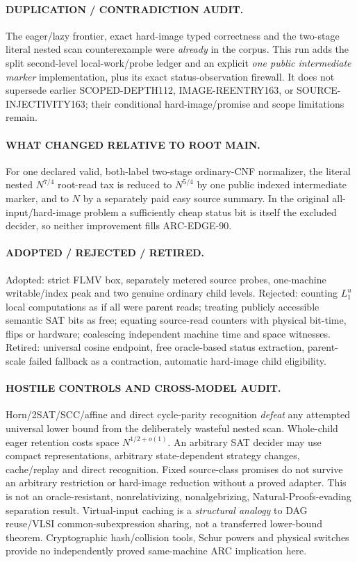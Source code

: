 \documentclass[11pt]{article}
\begin{document}
\paragraph{DUPLICATION / CONTRADICTION AUDIT.}
The eager/lazy frontier, exact hard-image
typed correctness and the two-stage
literal nested scan counterexample
were \emph{already} in the corpus.
This run adds the split second-level
local-work/probe ledger and an explicit
\emph{one public intermediate marker}
implementation, plus its exact
status-observation firewall.
It does not supersede earlier
SCOPED-DEPTH112, IMAGE-REENTRY163,
or SOURCE-INJECTIVITY163; their
conditional hard-image/promise and
scope limitations remain.

\paragraph{WHAT CHANGED RELATIVE TO ROOT MAIN.}
For one declared valid, both-label
two-stage ordinary-CNF normalizer,
the literal nested \(N^{7/4}\)
root-read tax is reduced to \(N^{5/4}\)
by one public indexed intermediate
marker, and to \(N\) by a separately
paid easy source summary. In the
original all-input/hard-image problem
a sufficiently cheap status bit is
itself the excluded decider, so neither
improvement fills ARC-EDGE-90.

\paragraph{ADOPTED / REJECTED / RETIRED.}
Adopted: strict FLMV box,
separately metered source probes,
one-machine writable/index peak
and two genuine ordinary child levels.
Rejected: counting \(L_1^u\) local
computations as if all were parent
reads; treating publicly accessible
semantic SAT bits as free;
equating source-read counters with
physical bit-time, flips or
hardware; coalescing independent
machine time and space witnesses.
Retired: universal cosine endpoint,
free oracle-based status extraction,
parent-scale failed fallback as a
contraction, automatic hard-image
child eligibility.

\paragraph{HOSTILE CONTROLS AND CROSS-MODEL AUDIT.}
Horn/2SAT/SCC/affine and direct
cycle-parity recognition \emph{defeat}
any attempted universal lower bound
from the deliberately wasteful nested
scan. Whole-child eager retention
costs space \(N^{1/2+o(1)}\).
An arbitrary SAT decider may use
compact representations, arbitrary
state-dependent strategy changes,
cache/replay and direct recognition.
Fixed source-class promises do not
survive an arbitrary restriction or
hard-image reduction without a
proved adapter. This is not an
oracle-resistant, nonrelativizing,
nonalgebrizing, Natural-Proofs-evading
separation result. Virtual-input
caching is a \emph{structural
analogy} to DAG reuse/VLSI
common-subexpression sharing, not
a transferred lower-bound theorem.
Cryptographic hash/collision tools,
Schur powers and physical switches
provide no independently proved
same-machine ARC implication here.
\end{document}
